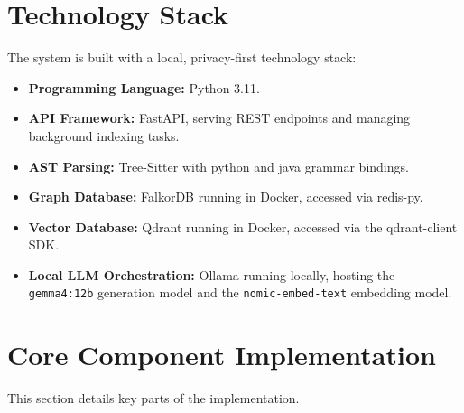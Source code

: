 \documentclass[12pt,a4paper,oneside]{report}
\begin{document}
\section{Technology Stack}
The system is built with a local, privacy-first technology stack:
\begin{itemize}
    \item \textbf{Programming Language:} Python 3.11.
    \item \textbf{API Framework:} FastAPI, serving REST endpoints and managing background indexing tasks.
    \item \textbf{AST Parsing:} Tree-Sitter with python and java grammar bindings.
    \item \textbf{Graph Database:} FalkorDB running in Docker, accessed via redis-py.
    \item \textbf{Vector Database:} Qdrant running in Docker, accessed via the qdrant-client SDK.
    \item \textbf{Local LLM Orchestration:} Ollama running locally, hosting the \texttt{gemma4:12b} generation model and the \texttt{nomic-embed-text} embedding model.
\end{itemize}

\section{Core Component Implementation}
This section details key parts of the implementation.
\end{document}
